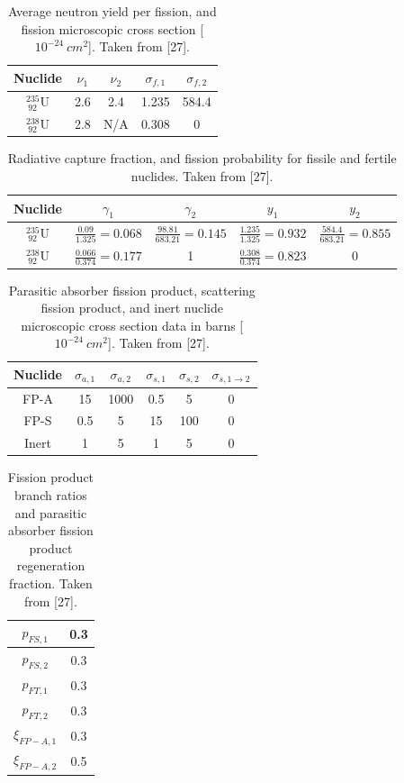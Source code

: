 %
%
\begin{table}[!hbp]
\centering
\caption{Average neutron yield per fission, and fission microscopic cross section [$10^{-24}~cm^2$]. Taken from [27].}
\begin{tabular}{|c|c|c|c|c|}
\hline
Nuclide &	  $\nu_1$ &	$\nu_2$ & $\sigma_{f,1}$ & $\sigma_{f,2} $ \\
\hline
$^{235} _{~92} \text{U}$   & 2.6 & 2.4 & 1.235  &  584.4 \\
\hline
$^{238} _{~92} \text{U}$   & 2.8 & N/A & 0.308 &  0   \\
\hline
\end{tabular}	
\label{tbl:fission_data}
\end{table}
%
%
%
\begin{table}[!hbp]
\centering
\caption{Radiative capture fraction, and fission probability for fissile and fertile nuclides.  Taken from [27].}
\begin{tabular}{|c|c|c|c|c|}
\hline
Nuclide &	 $\gamma_1$ & $\gamma_2$ &  $y_1$ & $y_2$ \\
\hline
$^{235} _{~92} \text{U}$   & $\frac{0.09}{1.325}=0.068$ & $\frac{98.81}{683.21}=0.145$ & $\frac{1.235}{1.325}=0.932$ & $\frac{584.4}{683.21}=0.855$ \\
\hline
$^{238} _{~92} \text{U}$   &  $\frac{0.066}{0.374}=0.177 $  & 1 &  $\frac{0.308}{0.374}=0.823$ & 0 \\
\hline
\end{tabular}	
\label{tbl:fission_data_2}
\end{table}
%
%
\begin{table}[!htp]
\centering
\caption{Parasitic absorber fission product, scattering fission product, and inert nuclide microscopic cross section data in barns [$10^{-24}~cm^2$].  Taken from [27].}
\begin{tabular}{|c|c|c|c|c|c|}
\hline
Nuclide  & $\sigma_{a,1}$ & $\sigma_{a,2}$	& $\sigma_{s,1}$	& $\sigma_{s,2}$ & $\sigma_{s,1\to2} $\\
\hline
FP-A & 15  & 1000  & 0.5  & 5 & 0 \\
\hline
FP-S  & 0.5  & 5  & 15  & 100 & 0 \\
\hline
Inert & 1 & 5  & 1 & 5 & 0 \\
\hline
\end{tabular}
\label{tbl:fp-data}
\end{table}
%
%
\begin{table}[!htp]
\centering
\caption{Fission product branch ratios and parasitic absorber fission product regeneration fraction.  Taken from [27].}
\begin{tabular}{|c|c|}
\hline
$p_{FS,1} $& 0.3\\
\hline
$p_{FS,2} $& 0.3\\
\hline
$p_{FT,1} $& 0.3\\
\hline
$p_{FT,2}$ & 0.3\\
\hline
$\xi_{FP-A,1}$ & 0.3 \\
\hline
$\xi_{FP-A,2}$ & 0.5\\
\hline
\end{tabular}
\label{tbl:fp_misc}
\end{table}
\newpage
